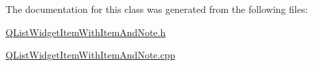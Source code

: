 The documentation for this class was generated from the following files\-:\begin{DoxyCompactItemize}
\item 
\hyperlink{_q_list_widget_item_with_item_and_note_8h}{Q\-List\-Widget\-Item\-With\-Item\-And\-Note.\-h}\item 
\hyperlink{_q_list_widget_item_with_item_and_note_8cpp}{Q\-List\-Widget\-Item\-With\-Item\-And\-Note.\-cpp}\end{DoxyCompactItemize}
